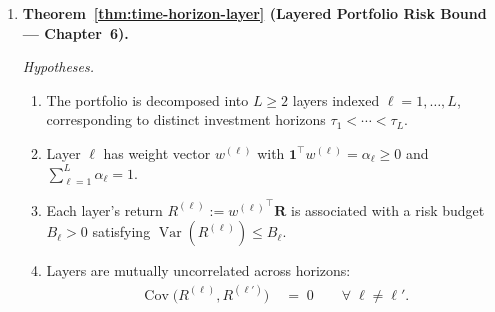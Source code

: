 \documentclass[12pt,openany]{book}
\newcommand{\bfw}{\mathbf{w}}
\newcommand{\bfone}{\mathbf{1}}
\DeclareMathOperator{\Var}{Var}
\DeclareMathOperator{\Cov}{Cov}
\numberwithin{equation}{chapter}
\theoremstyle{plain}
\theoremstyle{definition}
\theoremstyle{remark}
\def\mathcal#1{#1}%
\def\bfw{w}%
\begin{document}
\begin{enumerate}[label=\textbf{C\arabic*.}, leftmargin=*, widest=C4,
                  itemsep=6pt, parsep=2pt]
        \emph{Conclusion.}
        The rebalancing trigger $\mathcal{T}(t)$ satisfies
        \begin{align}
          \mathcal{T}(t) = 1
            &\;\iff\;
              H(t) = 1
              \;\text{ or }\;
              S(t) > \varepsilon_S.
          \label{eq:sum-trigger}
        \end{align}
        Furthermore:
        \begin{enumerate}[label=(\alph*), itemsep=2pt]
          \item Evaluating $H(t)$ requires $O(n)$ comparisons.
          \item Evaluating $S(t)$ requires $O(n^2)$ pairwise
                comparisons.
          \item Therefore $\mathcal{T}(t)$ is \emph{decidable} in $O(n^2)$
                time given $\bfw(t)$ and $\{\hat{\rho}_{ij}(t)\}$.
          \item The trigger is \emph{sound}: $\mathcal{T}(t)=1$ implies at
                least one constraint is violated or nearly violated.
          \item The trigger is \emph{complete}: if any hard constraint
                is violated or any soft violation exceeds
                $\varepsilon_S$, then $\mathcal{T}(t)=1$.
        \end{enumerate}

        \emph{Dependencies.} B2, B3; definitions of hard and soft
        constraints \eqref{eq:sum-hard-feas}--\eqref{eq:sum-soft-band}.

  \item \textbf{Theorem~\ref{thm:time-horizon-layer}
        (Layered Portfolio Risk Bound — Chapter~6).}

        \emph{Hypotheses.}
        \begin{enumerate}[label=(\roman*), itemsep=2pt]
          \item The portfolio is decomposed into $L \geq 2$ layers
                indexed $\ell = 1,\ldots,L$, corresponding to distinct
                investment horizons $\tau_1 < \cdots < \tau_L$.
          \item Layer $\ell$ has weight vector $\bfw^{(\ell)}$ with
                $\bfone^\top\bfw^{(\ell)} = \alpha_\ell \geq 0$ and
                $\sum_{\ell=1}^L \alpha_\ell = 1$.
          \item Each layer's return $R^{(\ell)} :=
                {\bfw^{(\ell)}}^\top \mathbf{R}$ is associated with
                a risk budget $B_\ell > 0$ satisfying
                $\Var(R^{(\ell)}) \leq B_\ell$.
          \item Layers are mutually uncorrelated across horizons:
                \begin{align}
                  \Cov\bigl(R^{(\ell)}, R^{(\ell')}\bigr)
                    &\;=\; 0
                  \qquad \forall\; \ell \neq \ell'.
                  \label{eq:sum-layer-uncorr}
                \end{align}
        \end{enumerate}


\end{enumerate}
\end{document}
